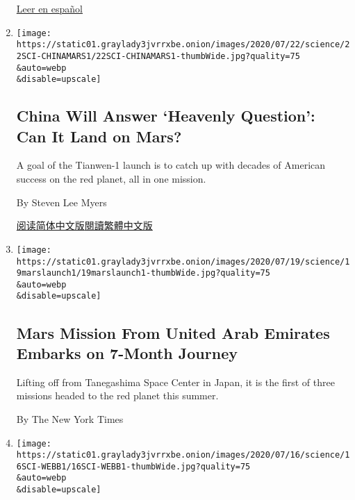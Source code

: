 \begin{enumerate}
  \href{https://www.nytimes3xbfgragh.onion/es/2020/07/24/espanol/ovnis-pentagono.html}{Leer
  en español}
\item
  \href{/2020/07/22/science/china-mars-mission.html}{}

  \texttt{[image: https://static01.graylady3jvrrxbe.onion/images/2020/07/22/science/22SCI-CHINAMARS1/22SCI-CHINAMARS1-thumbWide.jpg?quality=75\\\&auto=webp\\\&disable=upscale]}

  \hypertarget{china-will-answer-heavenly-question-can-it-land-on-mars}{%
  \subsection{China Will Answer `Heavenly Question': Can It Land on
  Mars?}\label{china-will-answer-heavenly-question-can-it-land-on-mars}}

  A goal of the Tianwen-1 launch is to catch up with decades of American
  success on the red planet, all in one mission.

  By Steven Lee Myers

  \href{https://cn.nytimes3xbfgragh.onion/science/20200723/china-mars-mission/}{阅读简体中文版}\href{https://cn.nytimes3xbfgragh.onion/science/20200723/china-mars-mission/zh-hant/}{閱讀繁體中文版}
\item
  \href{/2020/07/19/science/emirates-mars-mission.html}{}

  \texttt{[image: https://static01.graylady3jvrrxbe.onion/images/2020/07/19/science/19marslaunch1/19marslaunch1-thumbWide.jpg?quality=75\\\&auto=webp\\\&disable=upscale]}

  \hypertarget{mars-mission-from-united-arab-emirates-embarks-on-7-month-journey}{%
  \subsection{Mars Mission From United Arab Emirates Embarks on 7-Month
  Journey}\label{mars-mission-from-united-arab-emirates-embarks-on-7-month-journey}}

  Lifting off from Tanegashima Space Center in Japan, it is the first of
  three missions headed to the red planet this summer.

  By The New York Times
\item
  \href{/2020/07/16/science/nasa-james-webb-space-telescope-delay.html}{}

  \texttt{[image: https://static01.graylady3jvrrxbe.onion/images/2020/07/16/science/16SCI-WEBB1/16SCI-WEBB1-thumbWide.jpg?quality=75\\\&auto=webp\\\&disable=upscale]}


\end{enumerate}
